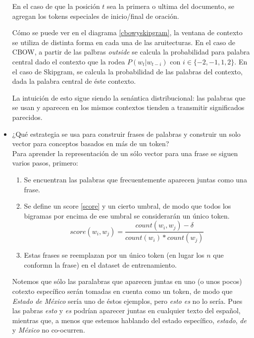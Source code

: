 \documentclass[letter, 11pt, twoside]{report}
\begin{document}
\begin{itemize}
    En el caso de que la posición $t$ sea la primera o ultima del documento, se agregan los tokens especiales de inicio/final de oración. 

    Cómo se puede ver en el diagrama \ref{cbowyskipgram}, la ventana de contexto se utiliza de distinta forma en cada una de las aruitecturas. En el caso de CBOW, a partir de las palbras \textit{outside} se calcula la probabilidad para palabra central dado el contexto que la rodea $P(w_t|w_{t-i})$ con $i\in\{-2,-1,1,2\}$. En el caso de Skipgram, se calcula la probabilidad de las palabras del contexto, dada la palabra central de éste contexto. 

    La intuición de esto sigue siendo la senántica distribucional: las palabras que se usan y aparecen en los mismos contextos tienden a transmitir significados parecidos.



    \item ¿Qué estrategia se usa para construir frases de palabras y construir un solo vector para conceptos basados en más de un token?\\
    Para aprender la representación de un sólo vector para una frase se siguen varios pasos, primero:
    \begin{enumerate}
      \item Se encuentran las palabras que frecuentemente aparecen juntas como una frase.
      \item Se define un score \ref{score} y un cierto umbral, de modo que todos los bigramas por encima de ese umbral se considerarán un único token.
      \begin{equation}
        score(w_i,w_j)=\frac{count(w_i,w_j)-\delta}{count(w_i)*count(w_j)}
        \label{score}
      \end{equation}
      \item Estas frases se reemplazan por un único token (en lugar los $n$ que conformn la frase) en el dataset de entrenamiento. 
    \end{enumerate}


    Notemos que sólo las paralabras que aparecen juntas en uno (o unos pocos) cotexto específico serán tomadas en cuenta como un token, de modo que \textit{Estado de México} sería uno de éstos ejemplos, pero \textit{esto es} no lo sería. Pues las pabras \textit{esto} y \textit{es} podrían aparecer juntas en cualquier texto del español, mientras que, a menos que estemos hablando del estado específico, \textit{estado}, \textit{de} y \textit{México} no co-ocurren. 


\end{itemize}
\end{document}
